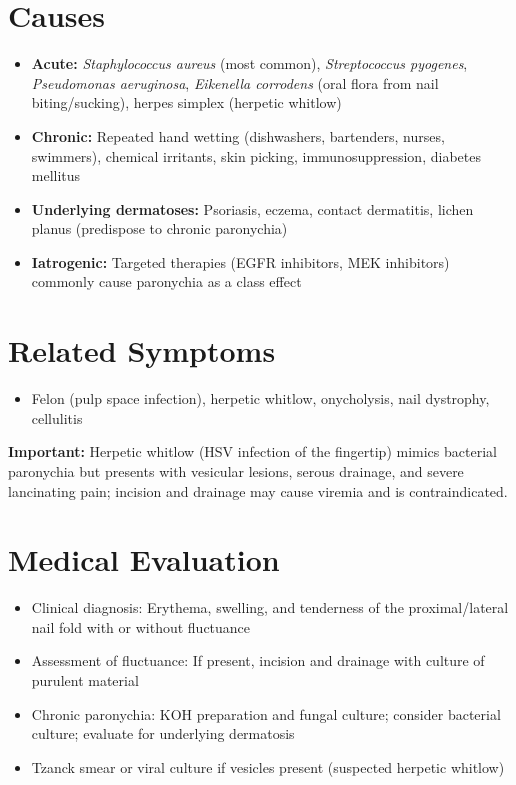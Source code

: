 \section*{Causes}
\begin{itemize}
  \item \textbf{Acute:} \textit{Staphylococcus aureus} (most common), \textit{Streptococcus pyogenes}, \textit{Pseudomonas aeruginosa}, \textit{Eikenella corrodens} (oral flora from nail biting/sucking), herpes simplex (herpetic whitlow)
  \item \textbf{Chronic:} Repeated hand wetting (dishwashers, bartenders, nurses, swimmers), chemical irritants, skin picking, immunosuppression, diabetes mellitus
  \item \textbf{Underlying dermatoses:} Psoriasis, eczema, contact dermatitis, lichen planus (predispose to chronic paronychia)
  \item \textbf{Iatrogenic:} Targeted therapies (EGFR inhibitors, MEK inhibitors) commonly cause paronychia as a class effect
\end{itemize}

\section*{Related Symptoms}
\begin{itemize}
  \item Felon (pulp space infection), herpetic whitlow, onycholysis, nail dystrophy, cellulitis
\end{itemize}
\textbf{Important:} Herpetic whitlow (HSV infection of the fingertip) mimics bacterial paronychia but presents with vesicular lesions, serous drainage, and severe lancinating pain; incision and drainage may cause viremia and is contraindicated.

\section*{Medical Evaluation}
\begin{itemize}
  \item Clinical diagnosis: Erythema, swelling, and tenderness of the proximal/lateral nail fold with or without fluctuance
  \item Assessment of fluctuance: If present, incision and drainage with culture of purulent material
  \item Chronic paronychia: KOH preparation and fungal culture; consider bacterial culture; evaluate for underlying dermatosis
  \item Tzanck smear or viral culture if vesicles present (suspected herpetic whitlow)
\end{itemize}


